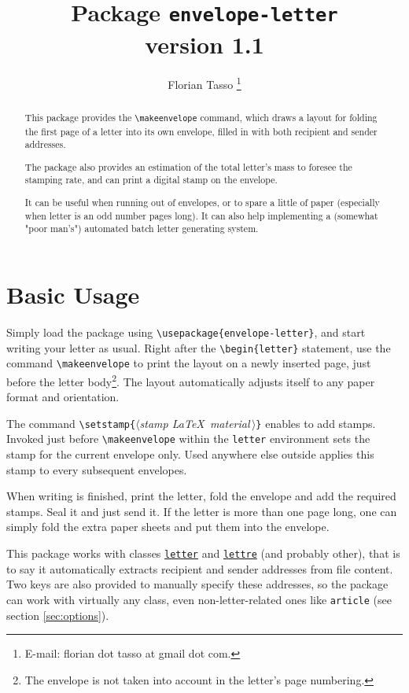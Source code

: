 \documentclass{article}
\title{Package \texttt{envelope-letter}\\\Large version 1.1}
\author{Florian Tasso \thanks{E-mail: florian dot tasso at gmail dot com.}}
\newcommand{\optarg}[1]{$\langle$\textit{#1}\,$\rangle$}
\begin{document}
	\maketitle

	\begin{abstract}
		This package provides the \verb|\makeenvelope| command, which draws a layout for folding the first page of a letter into its own envelope, filled in with both recipient and sender addresses.

		The package also provides an estimation of the total letter's mass to foresee the stamping rate, and can print a digital stamp on the envelope.

		It can be useful when running out of envelopes, or to spare a little of paper (especially when letter is an odd number pages long). It can also help implementing a (somewhat "poor man's") automated batch letter generating system.
	\end{abstract}

	\vfil

	\tableofcontents
	
	\vfil

	\clearpage

	\section{Basic Usage}
		Simply load the package using \verb|\usepackage{envelope-letter}|, and start writing your letter as usual. Right after the \verb|\begin{letter}| statement, use the command \verb|\makeenvelope| to print the layout on a newly inserted page, just before the letter body\footnote{The envelope is not taken into account in the letter's page numbering.}. The layout automatically adjusts itself to any paper format and orientation.

		The command \verb|\setstamp{|\optarg{stamp \LaTeX\ material}\verb|}| enables to add stamps. Invoked just before \verb|\makeenvelope| within the \verb|letter| environment sets the stamp for the current envelope only. Used anywhere else outside applies this stamp to every subsequent envelopes.

		When writing is finished, print the letter, fold the envelope and add the required stamps. Seal it and just send it. If the letter is more than one page long, one can simply fold the extra paper sheets and put them into the envelope.

		This package works with classes \href{https://ctan.org/pkg/letter}{\texttt{letter}} and \href{https://ctan.org/pkg/lettre}{\texttt{lettre}} (and probably other), that is to say it automatically extracts recipient and sender addresses from file content. Two keys are also provided to manually specify these addresses, so the package can work with virtually any class, even non-letter-related ones like \verb|article| (see section \ref{sec:options}).
\end{document}
